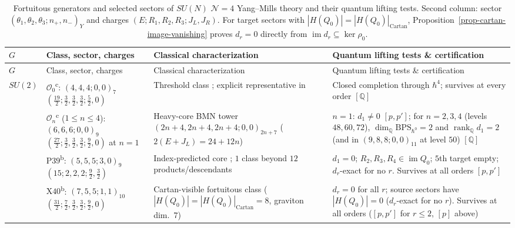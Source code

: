 \documentclass[11pt]{article}
\numberwithin{equation}{section}
\numberwithin{figure}{section}
\numberwithin{table}{section}
\newcommand{\HQ}{|H(Q_0)|}
\newcommand{\HQC}{|H(Q_0)|_{\mathrm{Cartan}}}
\begin{document}
{\footnotesize\renewcommand{\arraystretch}{1.28}\setlength{\tabcolsep}{3.5pt}
\begin{xltabular}{\linewidth}{|l|>{\raggedright\arraybackslash}p{3.55cm}|>{\raggedright\arraybackslash}X|>{\raggedright\arraybackslash}X|}
\caption{Fortuitous generators and selected sectors of $SU(N)$ $\mathcal N=4$ Yang--Mills theory and their quantum lifting tests. Second column: sector $(\theta_1,\theta_2,\theta_3;n_+,n_-)_Y$ and charges $(E;R_1,R_2,R_3;J_L,J_R)$. For target sectors with $\HQ=\HQC$, Proposition~\ref{prop-cartan-image-vanishing} proves $d_r=0$ directly from $\operatorname{im}d_r\subseteq\ker\rho_0$.}\label{local-ch9-su-classes}\\
\hline
$G$ & Class, sector, charges & Classical characterization & Quantum lifting tests \& certification\\
\hline\endfirsthead
\hline
$G$ & Class, sector, charges & Classical characterization & Quantum lifting tests \& certification\\
\hline\endhead
$SU(2)$ & $\mathcal O_0$\textsuperscript{c}: $(4,4,4;0,0)_7$\newline $(\tfrac{19}2;\tfrac32,\tfrac32,\tfrac32;\tfrac52,0)$ & Threshold class \cite{ChangLinWords}; explicit representative in \cite[Section 3.1]{microstates} & Closed completion through $\hbar^4$; survives at every order $[\mathbb Q]$\\
 & $\mathcal O_n$\textsuperscript{c} ($1\le n\le4$): $(6,6,6;0,0)_9$\newline $(\tfrac{27}2;\tfrac32,\tfrac32,\tfrac32;\tfrac92,0)$ at $n=1$ & Heavy-core BMN tower $(2n+4,2n+4,2n+4;0,0)_{2n+7}$ ($2(E+J_L)=24+12n$) \cite[Section 3.1]{microstates} & $n=1$: $d_1\ne0$ \cite{KKLP} $[p,p']$; for $n=2,3,4$ (levels $48,60,72$), $\dim_{\mathbb Q}\mathrm{BPS}_{\hbar^0}=2$ and $\operatorname{rank}_{\mathbb Q}d_1=2$ (and in $(9,8,8;0,0)_{11}$ at level $50$) $[\mathbb Q]$ \cite{Repo}\\
 & $\mathrm{P39}$\textsuperscript{b}: $(5,5,5;3,0)_9$\newline $(15;2,2,2;\tfrac92,\tfrac32)$ & Index-predicted core \cite[Section 3.2]{microstates}; $1$ class beyond $12$ products/descendants & $d_1=0$; $R_2,R_3,R_4\in\operatorname{im}Q_0$; $5$th target empty; $d_r$-exact for no $r$. Survives at all orders $[p,p']$\\
 & $\mathrm{X40}$\textsuperscript{b}: $(7,5,5;1,1)_{10}$\newline $(\tfrac{31}2;\tfrac72,\tfrac32,\tfrac32;\tfrac92,0)$ & Cartan-visible fortuitous class ($\HQ=\HQC=8$, graviton dim.\ $7$) \cite[Section 3.2]{microstates} & $d_r=0$ for all $r$; source sectors have $\HQ=0$ ($d_r$-exact for no $r$). Survives at all orders ($[p,p']$ for $r\le2$, $[p]$ above)\\

\end{xltabular}}
\end{document}
